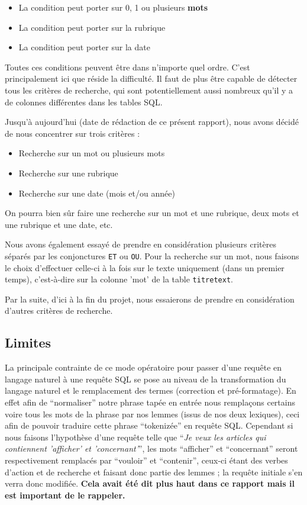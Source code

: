 \begin{itemize}
  \item La condition peut porter sur 0, 1 ou plusieurs \textbf{mots}
  \item La condition peut porter sur la rubrique
  \item La condition peut porter sur la date
\end{itemize}

Toutes ces conditions peuvent être dans n'importe quel ordre. C'est principalement ici que réside la difficulté. Il faut de plus être capable de détecter tous les critères de recherche, qui sont potentiellement aussi nombreux qu'il y a de colonnes différentes dans les tables SQL.

\medskip

Jusqu'à aujourd'hui (date de rédaction de ce présent rapport), nous avons décidé de nous concentrer sur trois critères :

\begin{itemize}
    \item Recherche sur un mot ou plusieurs mots
    \item Recherche sur une rubrique
    \item Recherche sur une date (mois et/ou année)
\end{itemize}
On pourra bien sûr faire une recherche sur un mot et une rubrique, deux mots et une rubrique et une date, etc.

\medskip

Nous avons également essayé de prendre en considération plusieurs critères séparés par les conjonctures \lstinline{ET} ou \lstinline{OU}.
Pour la recherche sur un mot, nous faisons le choix d'effectuer celle-ci à la fois sur le texte uniquement (dans un premier temps), c'est-à-dire sur la colonne 'mot' de la table \lstinline{titretext}.

\medskip

Par la suite, d'ici à la fin du projet, nous essaierons de prendre en considération d'autres critères de recherche.

\subsection{Limites}

La principale contrainte de ce mode opératoire pour passer d'une requête en langage naturel à une requête SQL se pose au niveau de la transformation du langage naturel et le remplacement des termes (correction et pré-formatage). En effet afin de ``normaliser'' notre phrase tapée en entrée nous remplaçons certains voire tous les mots de la phrase par nos lemmes (issus de nos deux lexiques), ceci afin de pouvoir traduire cette phrase ``tokenizée'' en requête SQL. Cependant si nous faisons l'hypothèse d'une requête telle que ``\textit{Je veux les articles qui contiennent 'afficher' et 'concernant'}'', les mots ``afficher'' et ``concernant'' seront respectivement remplacés par ``vouloir'' et ``contenir'', ceux-ci étant des verbes d'action et de recherche et faisant donc partie des lemmes ; la requête initiale s'en verra donc modifiée. \textbf{Cela avait été dit plus haut dans ce rapport mais il est important de le rappeler.}

